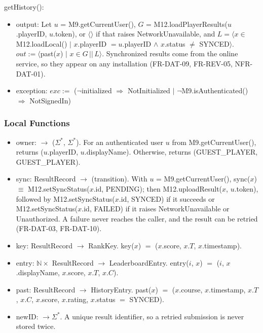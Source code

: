 \documentclass[12pt, titlepage]{article}
\newcommand{\noinit}{$\neg$initialized $\Rightarrow$ NotInitialized}
\begin{document}
\noindent getHistory():
\begin{itemize}
\item output: Let $u$ = M9.getCurrentUser(), $G$ =
  M12.loadPlayerResults($u$.playerID, $u$.token), or $\langle\rangle$ if that
  raises NetworkUnavailable, and $L = \langle x \in$ M12.loadLocal() $|$
  $x$.playerID $= u$.playerID $\wedge$ $x$.status $\neq$ SYNCED$\rangle$. \\
  $out := \langle$past($x$) $|$ $x \in G \,||\, L\rangle$. Synchronized results
  come from the online service, so they appear on any installation
  (FR-DAT-09, FR-REV-05, NFR-DAT-01).
\item exception: $exc :=$ (\noinit{} $|$ $\neg$M9.isAuthenticated()
  $\Rightarrow$ NotSignedIn)
\end{itemize}

\subsubsection{Local Functions}

\begin{itemize}
\item owner: $\rightarrow$ ($\Sigma^*$, $\Sigma^*$). For an authenticated
  user $u$ from M9.getCurrentUser(), returns ($u$.playerID, $u$.displayName).
  Otherwise, returns (GUEST\_PLAYER, GUEST\_PLAYER).
\item sync: ResultRecord $\rightarrow$ (transition). With $u$ =
  M9.getCurrentUser(), sync($x$) $\equiv$ M12.setSyncStatus($x$.id,
  PENDING); then M12.uploadResult($x$, $u$.token), followed by
  M12.setSyncStatus($x$.id, SYNCED) if it succeeds or M12.setSyncStatus($x$.id,
  FAILED) if it raises NetworkUnavailable or Unauthorized. A failure never
  reaches the caller, and the result can be retried (FR-DAT-03, FR-DAT-10).
\item key: ResultRecord $\rightarrow$ RankKey. key($x$) $=$ ($x$.score,
  $x.T$, $x$.timestamp).
\item entry: $\mathbb{N} \times$ ResultRecord $\rightarrow$
  LeaderboardEntry. entry($i$, $x$) $=$ ($i$, $x$.displayName, $x$.score,
  $x.T$, $x.C$).
\item past: ResultRecord $\rightarrow$ HistoryEntry. past($x$) $=$
  ($x$.course, $x$.timestamp, $x.T$, $x.C$, $x$.score, $x$.rating, $x$.status
  $=$ SYNCED).
\item newID: $\rightarrow \Sigma^*$. A unique result identifier, so a retried
  submission is never stored twice.
\end{itemize}
\end{document}
